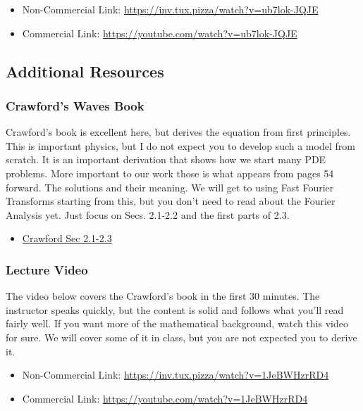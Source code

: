 \href{https://inv.tux.pizza/watch?v=ub7lok-JQJE}{\pandocbounded{\texttt{[image: https://markdown-videos-api.jorgenkh.no/youtube/ub7lok-JQJE?width=720\&height=405]}}}

\begin{itemize}
\tightlist
\item
  Non-Commercial Link: \url{https://inv.tux.pizza/watch?v=ub7lok-JQJE}
\item
  Commercial Link: \url{https://youtube.com/watch?v=ub7lok-JQJE}
\end{itemize}

\subsection{Additional Resources}\label{additional-resources}

\subsubsection{Crawford's Waves Book}\label{crawfords-waves-book}

Crawford's book is excellent here, but derives the equation from first
principles. This is important physics, but I do not expect you to
develop such a model from scratch. It is an important derivation that
shows how we start many PDE problems. More important to our work those
is what appears from pages 54 forward. The solutions and their meaning.
We will get to using Fast Fourier Transforms starting from this, but you
don't need to read about the Fourier Analysis yet. Just focus on Secs.
2.1-2.2 and the first parts of 2.3.

\begin{itemize}
\tightlist
\item
  \href{../assets/scans/Crawford-Waves-Sec_2.1-2.3.pdf}{Crawford Sec
  2.1-2.3}
\end{itemize}

\subsubsection{Lecture Video}\label{lecture-video}

The video below covers the Crawford's book in the first 30 minutes. The
instructor speaks quickly, but the content is solid and follows what
you'll read fairly well. If you want more of the mathematical
background, watch this video for sure. We will cover some of it in
class, but you are not expected you to derive it.

\href{https://inv.tux.pizza/watch?v=1JeBWHzrRD4}{\pandocbounded{\texttt{[image: https://markdown-videos-api.jorgenkh.no/youtube/1JeBWHzrRD4?width=720\&height=405]}}}

\begin{itemize}
\tightlist
\item
  Non-Commercial Link: \url{https://inv.tux.pizza/watch?v=1JeBWHzrRD4}
\item
  Commercial Link: \url{https://youtube.com/watch?v=1JeBWHzrRD4}
\end{itemize}
